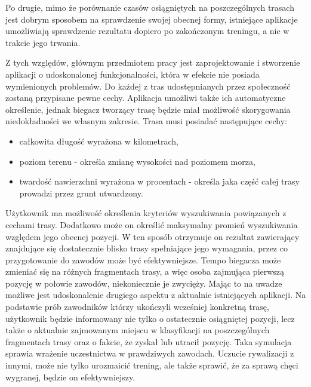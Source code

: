 Po drugie, mimo że porównanie czasów osiągniętych na poszczególnych trasach jest dobrym sposobem na sprawdzenie swojej obecnej formy, istniejące aplikacje umożliwiają sprawdzenie rezultatu dopiero po zakończonym treningu, a nie w trakcie jego trwania.

Z tych względów, głównym przedmiotem pracy jest zaprojektowanie i stworzenie aplikacji o udoskonalonej funkcjonalności, która w efekcie nie posiada wymienionych problemów. Do każdej z tras udostępnianych przez społeczność zostaną przypisane pewne cechy. Aplikacja umożliwi także ich automatyczne określenie, jednak biegacz tworzący trasę będzie miał możliwość skorygowania niedokładności we własnym zakresie. Trasa musi posiadać następujące cechy:
\begin{itemize}
\item całkowita długość wyrażona w kilometrach,
\item poziom terenu - określa zmianę wysokości nad poziomem morza,
\item twardość nawierzchni wyrażona w procentach - określa jaka część całej trasy prowadzi przez grunt utwardzony.
\end{itemize}
Użytkownik ma możliwość określenia kryteriów wyszukiwania powiązanych z cechami trasy. Dodatkowo może on określić maksymalny promień wyszukiwania względem jego obecnej pozycji. W ten sposób otrzymuje on rezultat zawierający znajdujące się dostatecznie blisko trasy spełniające jego wymagania, przez co przygotowanie do zawodów może być efektywniejsze. Tempo biegacza może zmieniać się na różnych fragmentach trasy, a więc osoba zajmująca pierwszą pozycję w połowie zawodów, niekoniecznie je zwycięży. Mając to na uwadze możliwe jest udoskonalenie drugiego aspektu z aktualnie istniejących aplikacji. Na podstawie prób zawodników którzy ukończyli wcześniej konkretną trasę, użytkownik będzie informowany nie tylko o ostatecznie osiągniętej pozycji, lecz także o aktualnie zajmowanym miejscu w klasyfikacji na poszczególnych fragmentach trasy oraz o fakcie, że zyskał lub utracił pozycję. Taka symulacja sprawia wrażenie uczestnictwa w prawdziwych zawodach. Uczucie rywalizacji z innymi, może nie tylko urozmaicić trening, ale także sprawić, że za sprawą chęci wygranej, będzie on efektywniejszy.

